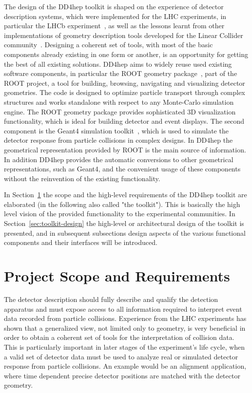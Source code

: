 \documentclass[a4paper]{jpconf}
\begin{document}
\noindent
The design of the DD4hep toolkit\cite{bib:DD4hep} 
is shaped on the experience of detector description 
systems, which were implemented for the LHC experiments, in particular 
the LHCb experiment~\cite{bib:LHCb,bib:LHCb-geometry}, 
as well as the lessons learnt from other
implementations of geometry description tools developed for 
the Linear Collider community~\cite{bib:ILD,bib:SiD}. 
Designing a coherent set of tools, with most of the basic components 
already existing in one form or another, is an opportunity for getting 
the best of all existing solutions. 
DD4hep aims to widely reuse used existing software components, in particular
the ROOT geometry package~\cite{bib:ROOT-tgeo}, part of the 
ROOT project\cite{bib:ROOT}, a tool for 
building, browsing, navigating and visualizing detector geometries. The
code is designed to optimize particle transport through complex 
structures and works standalone with respect to any Monte-Carlo 
simulation engine. The ROOT geometry package provides
sophisticated 3D visualization functionality, which is ideal for building 
detector and event displays. The second component is 
the Geant4 simulation toolkit~\cite{bib:geant4}, which is used to 
simulate the detector response from particle collisions in complex designs.
In DD4hep the geometrical
representation provided by ROOT is the main source of information.
In addition DD4hep provides the automatic conversions to other geometrical 
representations, such as Geant4, and the convenient usage of these 
components without the reinvention of the existing functionality.

\noindent
In Section~\ref{sec:architectural-concepts} the scope and the high-level 
requirements of the DD4hep toolkit are elaborated (in the following 
also called "the toolkit"). This is basically the high level vision 
of the provided functionality to the experimental communities. 
In Section~\ref{sec:toolkit-design} the high-level or architectural design 
of the toolkit is presented, and in subsequent subsections design 
aspects of the various functional components and their interfaces will be
introduced.

\section{Project Scope and Requirements}
\label{sec:architectural-concepts}
\noindent
The detector description should fully describe and qualify 
the detection apparatus and must expose access to all information
required to interpret event data recorded from particle collisions.
Experience from the LHC experiments has shown that a generalized
view, not limited only to geometry, is very beneficial in order to obtain 
a coherent set of tools for the interpretation of collision data.
This is particularly important in later stages of the experiment's life cycle,
when a valid set of detector data must be used to analyze real or simulated 
detector response from particle collisions. An example would be an alignment 
application, where time dependent precise detector positions are matched 
with the detector geometry.
\end{document}
